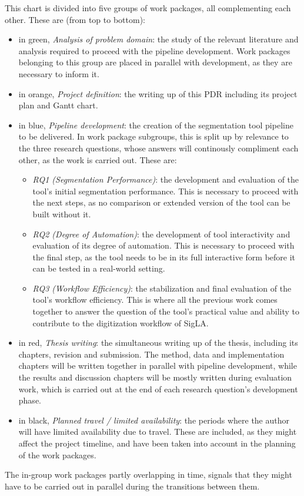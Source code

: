 \noindent
This chart is divided into five groups of work packages, all complementing each other. These are (from top to bottom): 
\begin{itemize}
    \item in green, \textit{Analysis of problem domain}: the study of the relevant literature and analysis required to proceed with the pipeline development. Work packages belonging to this group are placed in parallel with development, as they are necessary to inform it.
    \item in orange, \textit{Project definition}: the writing up of this \acf{PDR} including its project plan and Gantt chart.
    \item in blue, \textit{Pipeline development}: the creation of the segmentation tool pipeline to be delivered. In work package subgroups, this is split up by relevance to the three research questions, whose answers will continously compliment each other, as the work is carried out. These are:
    \begin{itemize}
        \item \textit{RQ1 (Segmentation Performance)}: the development and evaluation of the tool's initial segmentation performance. This is necessary to proceed with the next steps, as no comparison or extended version of the tool can be built without it.
        \item \textit{RQ2 (Degree of Automation)}: the development of tool interactivity and evaluation of its degree of automation. This is necessary to proceed with the final step, as the tool needs to be in its full interactive form before it can be tested in a real-world setting.
        \item \textit{RQ3 (Workflow Efficiency)}: the stabilization and final evaluation of the tool's workflow efficiency. This is where all the previous work comes together to answer the question of the tool's practical value and ability to contribute to the digitization workflow of SigLA.
    \end{itemize}
    \item in red, \textit{Thesis writing}: the simultaneous writing up of the thesis, including its chapters, revision and submission. The method, data and implementation chapters will be written together in parallel with pipeline development, while the results and discussion chapters will be mostly written during evaluation work, which is carried out at the end of each research question's development phase.
    \item in black, \textit{Planned travel / limited availability}: the periods where the author will have limited availability due to travel. These are included, as they might affect the project timeline, and have been taken into account in the planning of the work packages.
\end{itemize}
The in-group work packages partly overlapping in time, signals that they might have to be carried out in parallel during the transitions between them. 



